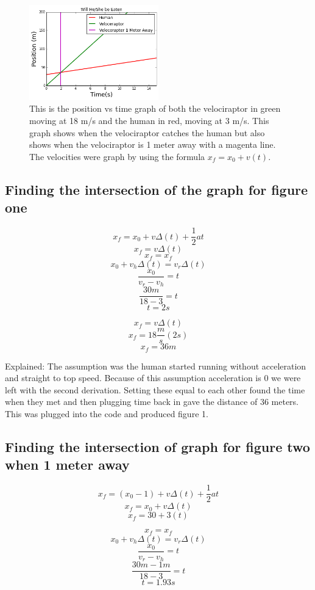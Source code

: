 \documentclass[twocolumn]{revtex4}
\begin{document}
\begin{figure}[h]
	\includegraphics[width = 0.5\textwidth] {1_meter_away.png}
	\caption{This is the position vs time graph of both the velociraptor in green moving at 18 m/s  and the human in red, moving at 3 m/s. This graph shows when the velociraptor catches the human but also shows when the velociraptor is 1 meter away with a magenta line. The velocities were graph by using the formula $x_f = x_0 + v(t)$.   \label{fig:Graph when Velociraptor is 1 meter away from the Person}}
\end{figure}


\subsection{Finding the intersection of the graph for figure one}
$$x_f = x_0 + v\Delta(t) + \frac{1}{2}at$$
$$x_f =  v\Delta(t)$$
$$x_f = x_f$$
$$ x_0 + v_h\Delta(t)=  v_r\Delta(t)$$
$$\frac{x_0}{v_r - v_h} = t$$ 
$$ \frac{30m}{18- 3 }=t$$
$$ t = 2s$$

$$x_f = v \Delta(t)$$
$$x_f = 18 \frac{m}{s}(2s)$$
$$x_f = 36m$$



Explained:
The assumption was the human started running without acceleration and straight to top speed. Because of this assumption acceleration is 0 we were left with the second derivation. Setting these equal to each other found the time when they met and then plugging time back in gave the distance of 36 meters. This was plugged into the code and produced figure 1.

\subsection{Finding the intersection of graph for figure two when 1 meter away}
$$x_f = (x_0-1) + v\Delta(t) + \frac{1}{2}at$$
$$x_f = x_0 + v\Delta(t)$$
$$x_f = 30 + 3(t)$$

$$x_f = x_f$$
$$ x_0 + v_h\Delta(t)=  v_r\Delta(t)$$
$$\frac{x_0}{v_r - v_h} = t$$ 
$$ \frac{30m -1m}{18- 3 }=t$$
$$ t = 1.93s$$
\end{document}
